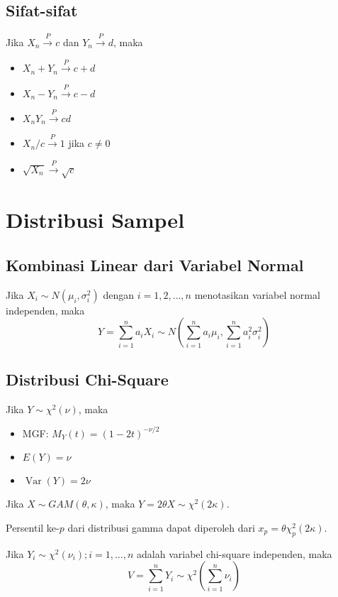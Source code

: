 \documentclass[a4paper,extrafontsizes, 9pt]{memoir}
\DeclareMathOperator{\Var}{Var}
\begin{document}
\begin{multicols}{3}
                \subsection*{\small Sifat-sifat}
                Jika $X_n\xrightarrow{P}c$ dan $Y_n\xrightarrow{P}d$, maka
                \begin{itemize}
                    \setlength\itemsep{0.5mm}
                    \item $X_n+Y_n\xrightarrow{P}c+d$
                    \item $X_n-Y_n\xrightarrow{P}c-d$
                    \item $X_nY_n\xrightarrow{P}cd$
                    \item $X_n/c\xrightarrow{P}1$ jika $c\neq 0$
                    \item $\sqrt{X_n}\xrightarrow{P}\sqrt{c}$
                \end{itemize}
            \section*{\small Distribusi Sampel}
            \subsection*{\small Kombinasi Linear dari Variabel Normal}
                Jika $X_i\sim N(\mu_i,\sigma_i^2)$ dengan $i=1,2,\dots,n$ menotasikan variabel normal independen, maka
                \[Y=\sum_{i=1}^{n}a_iX_i\sim N\left(\sum_{i=1}^{n}a_i\mu_i,\sum_{i=1}^{n}a_i^2\sigma_i^2\right)\]
            \subsection*{\small Distribusi Chi-Square}
                Jika $Y\sim\chi^2(\nu)$, maka
                \begin{itemize}
                    \item MGF: $M_Y(t)=(1-2t)^{-\nu/2}$
                    \item $E(Y)=\nu$
                    \item $\Var(Y)=2\nu$
                \end{itemize}
                Jika $X\sim GAM(\theta,\kappa)$, maka $Y=2\theta X\sim\chi^2(2\kappa)$.

                Persentil ke-$p$ dari distribusi gamma dapat diperoleh dari $x_p=\theta\chi^2_p(2\kappa)$.

                Jika $Y_i\sim\chi^2(\nu_i);i=1,\dots,n$ adalah variabel chi-square independen, maka
                \[V=\sum_{i=1}^{n}Y_i\sim\chi^2\left(\sum_{i=1}^{n}\nu_i\right)\]


\end{multicols}
\end{document}
